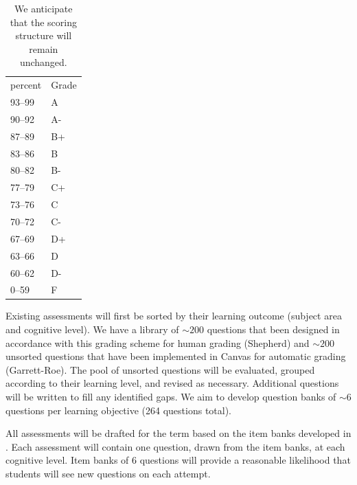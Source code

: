 \documentclass[10pt,letterpaper]{article}
\begin{document}
\begin{table}
\sffamily\footnotesize
\begin{tabular}{ll}
percent&Grade\\
93--99&A\\
90--92&A-\\
87--89&B+\\
83--86&B\\
80--82&B-\\
77--79&C+\\
73--76&C\\
70--72&C-\\
67--69&D+\\
63--66&D\\
60--62&D-\\
0--59&F
\end{tabular}
\caption{\label{tbl:points}
We anticipate that the scoring structure will remain unchanged.} 
\end{table}

%
%


\label{ssa:question_bank} Existing assessments will first be sorted by their learning outcome (subject area and cognitive level). We have a library of $\sim200$ questions that been designed in accordance with this grading scheme for human grading (Shepherd) and $\sim200$ unsorted questions that have been implemented in Canvas for automatic grading (Garrett-Roe). The pool of unsorted questions will be evaluated, grouped according to their learning level, and revised as necessary. Additional questions will be written to fill any identified gaps. We aim to develop question banks of $\sim6$ questions per learning objective (264 questions total). 



All assessments will be drafted for the term based on the item banks developed in . Each assessment will contain one question, drawn from the item banks, at each cognitive level. Item banks of 6 questions will provide a reasonable likelihood that students will see new questions on each attempt.
\end{document}
